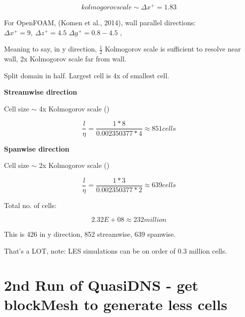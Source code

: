 \documentclass[12pt]{article}
\renewcommand{\_}{\kern-1.5pt\textunderscore\kern-1.5pt}
\begin{document}
\vspace{\baselineskip}
 \[ kolmogorov scale  \sim   \Delta x^{+}=1.83 \] \par

For OpenFOAM, (Komen et al., 2014), wall parallel directions: \(   \Delta x^{+}=9,~  \Delta z^{+}=4.5 \)   \(  \Delta y^{+}=0.8-4.5 \) , \par

Meaning to say, in y direction, $\frac{1}{2}$ Kolmogorov scale is sufficient to resolve near wall, 2x Kolmogorov scale far from wall.\par


\vspace{\baselineskip}

\vspace{\baselineskip}
Split domain in half. Largest cell is 4x of smallest cell.\par

\textbf{Streamwise direction}\par

Cell size $ \sim $  4x Kolmogorov scale (\cite{Komen2014})\par

 \[ \frac{l}{ \eta }=\frac{1\ast8}{0.002350377\ast4} \approx 851 cells \] \par

\textbf{Spanwise direction}\par

Cell size $ \sim $  2x Kolmogorov scale (\cite{Komen2014})\par

 \[ \frac{l}{ \eta }=\frac{1\ast3}{0.002350377\ast2} \approx 639 cells \] \par

Total no. of cells:\par

 \[ 2.32E+08 \approx 232 million \] \par

This is 426 in y direction, 852 streamwise, 639 spanwise.\par

That’s a LOT, note: LES simulations can be on order of  \( \text{0.3 million} \)  cells.\par

\section{2nd Run of QuasiDNS - get blockMesh to generate less cells}
\end{document}
